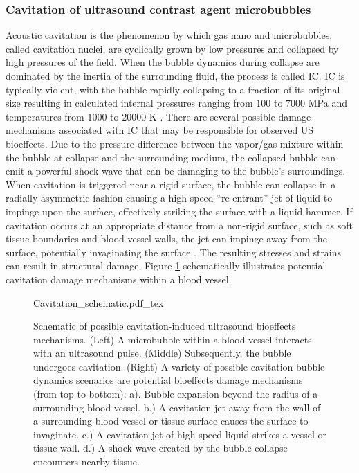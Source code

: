 \subsubsection{Cavitation of ultrasound contrast agent
  microbubbles} \label{subsec:bioeffects_mechanisms_ceus}%
Acoustic cavitation is the phenomenon by which gas nano and
microbubbles, called cavitation nuclei, are cyclically grown by low
pressures and collapsed by high pressures of the field. When the
bubble dynamics during collapse are dominated by the inertia of the
surrounding fluid, the process is called \ac{IC}. \ac{IC} is typically violent,
with the bubble rapidly collapsing to a fraction of its original size
resulting in calculated internal pressures ranging from $100$ to
$7000$ MPa and temperatures from $1000$ to $20 000$ K
\citep{Flynn1982}. There are several possible damage mechanisms
associated with \ac{IC} that may be responsible for observed \ac{US}
bioeffects. Due to the pressure difference between the vapor/gas
mixture within the bubble at collapse and the surrounding medium, the
collapsed bubble can emit a powerful shock wave that can be damaging
to the bubble's surroundings. When cavitation is triggered near a
rigid surface, the bubble can collapse in a radially asymmetric
fashion causing a high-speed ``re-entrant'' jet of liquid to impinge
upon the surface, effectively striking the surface with a liquid
hammer. If cavitation occurs at an appropriate distance from a
non-rigid surface, such as soft tissue boundaries and blood vessel
walls, the jet can impinge away from the surface, potentially
invaginating the surface \citep{Brujan2011}. The resulting stresses
and strains can result in structural damage. Figure
\ref{fig:intro_cavitation_schematic} schematically illustrates
potential cavitation damage mechanisms within a blood vessel.
\begin{figure}
  \centering
  \def\svgwidth{0.9\textwidth}
  {Cavitation_schematic.pdf_tex} \hfill%
  \caption[Schematic of possible ultrasound bioeffects
  mechanisms]{Schematic of possible cavitation-induced ultrasound
    bioeffects mechanisms. (Left) A microbubble within a blood vessel
    interacts with an ultrasound pulse. (Middle) Subsequently, the
    bubble undergoes cavitation. (Right) A variety of possible
    cavitation bubble dynamics scenarios are potential bioeffects
    damage mechanisms (from top to bottom): a). Bubble expansion
    beyond the radius of a surrounding blood vessel. b.) A cavitation
    jet away from the wall of a surrounding blood vessel or tissue
    surface causes the surface to invaginate. c.) A cavitation jet of
    high speed liquid strikes a vessel or tissue wall. d.) A shock
    wave created by the bubble collapse encounters nearby tissue.}
  \label{fig:intro_cavitation_schematic}
\end{figure}

